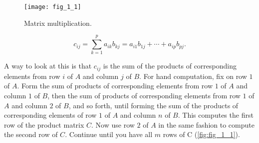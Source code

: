 \documentclass[../main.tex]{subfiles}
\begin{document}
\begin{figure}
	\centering
	\texttt{[image: fig\_1\_1]}
	\caption{Matrix multiplication.}
	\label{fig:fig_1_1}
\end{figure}

$$c_{ij} =  \sum_{k=1}^{p} a_{ik} b_{kj} = a_{i1} b_{1j} + \cdots + a_{ip} b_{pj} .$$

A way to look at this is that $c_{ij}$ is the sum of the products of corresponding elements from row $i$ of $A$ and column $j$ of $B$. For hand computation, fix on row $1$ of $A$. Form the sum of products of corresponding elements from row $1$ of $A$ and column $1$ of $B$, then the sum of products of corresponding elements from row $1$ of $A$ and column $2$ of $B$, and so forth, until forming the sum of the products of corresponding elements of row $1$ of $A$ and column $n$ of $B$. This computes the first row of the product matrix $C$. Now use row $2$ of $A$ in the same fashion to compute the second row of $C$. Continue until you have all $m$ rows of C (\autoref{fig:fig_1_1}).
\end{document}

